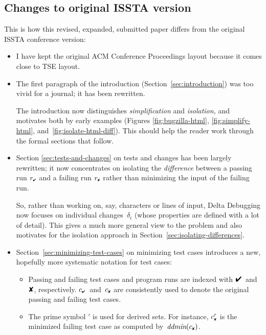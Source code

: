 \documentclass{acm_proc_article-sp}
\newcommand{\ISSTA}      {{\small ISSTA}\xspace}
\newcommand{\PASS}{\text{\ding{52}}\xspace}
\newcommand{\FAIL}{\text{\ding{56}}\xspace}
\newcommand{\rpass}{{r_{\scriptscriptstyle \PASS}}}
\newcommand{\rfail}{{r_{\scriptscriptstyle \FAIL}}}
\newcommand{\cpass}{{c_{\scriptscriptstyle \PASS}}}
\newcommand{\cfail}{{c_{\scriptscriptstyle \FAIL}}}
\newcommand{\dfail}{{c'_{\scriptscriptstyle \FAIL}}}
\newcommand{\ddmin}{\textit{ddmin}\xspace}
\theoremstyle{plain}
\begin{document}
\subsection*{Changes to original ISSTA version}
\medskip

This is how this revised, expanded, submitted paper differs from the
original \ISSTA conference version:

\begin{itemize}
\item I have kept the original ACM Conference Proceedings layout
  because it comes close to TSE layout.
  
\item The first paragraph of the introduction
  (Section~\ref{sec:introduction}) was too vivid for a journal; it has
  been rewritten.
  
  The introduction now distinguishes \emph{simplification} and
  \emph{isolation,} and motivates both by early examples (Figures
  \ref{fig:bugzilla-html}, \ref{fig:simplify-html},
  and~\ref{fig:isolate-html-diff}).  This should help the reader work
  through the formal sections that follow.
  
\item Section \ref{sec:tests-and-changes} on tests and changes has
  been largely rewritten; it now concentrates on isolating the
  \emph{difference} between a passing run $\rpass$ and a failing run
  $\rfail$ rather than minimizing the input of the failing run.
  
  So, rather than working on, say, characters or lines of input, Delta
  Debugging now focuses on individual changes~$\delta_i$ (whose properties
  are defined with a lot of detail).  This gives a much more general
  view to the problem and also motivates for the isolation approach in
  Section~\ref{sec:isolating-differences}.
  
\item Section~\ref{sec:minimizing-test-cases} on minimizing test cases
  introduces a new, hopefully more systematic notation for test cases:
  \begin{itemize}
  \item Passing and failing test cases and program runs are indexed
    with $\PASS$~and~$\FAIL$, respectively.  $\cpass$~and~$\cfail$ are
    consistently used to denote the original passing and failing test
    cases.

  \item The prime symbol ${}'$ is used for derived sets.  For
    instance, $\dfail$ is the minimized failing test case as computed
    by~$\ddmin(\cfail)$.
    

\end{itemize}
\end{itemize}
\end{document}

